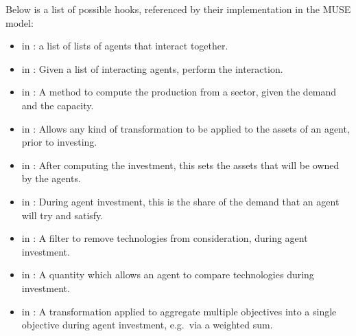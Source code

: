 \documentclass[letterpaper,10pt,english]{sphinxmanual}
\begin{document}
Below is a list of possible hooks, referenced by their implementation in the MUSE model:
\begin{itemize}
\item {} 
 in : a list of lists of agents that interact together.

\item {} 
 in : Given a list of interacting agents, perform the interaction.

\item {} 
 in : A method to compute the production from a sector, given the demand and the capacity.

\item {} 
 in : Allows any kind of transformation to be applied to the assets of an agent, prior to investing.

\item {} 
 in : After computing the investment, this sets the assets that will be owned by the agents.

\item {} 
 in : During agent investment, this is the share of the demand that an agent will try and satisfy.

\item {} 
 in : A filter to remove technologies from consideration, during agent investment.

\item {} 
 in : A quantity which allows an agent to compare technologies during investment.

\item {} 
 in : A transformation applied to aggregate multiple objectives into a single objective during agent investment, e.g. via a weighted sum.


\end{itemize}
\end{document}
